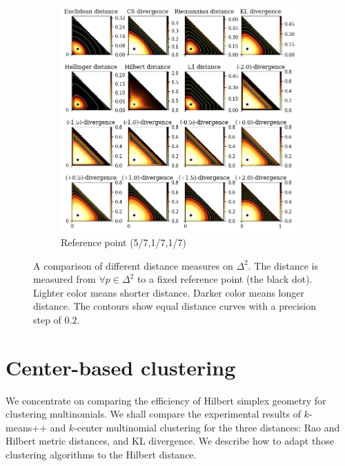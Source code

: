 \documentclass[graybox]{svmult}
\begin{document}
\begin{figure}\ContinuedFloat
\centering
\begin{subfigure}{\textwidth}
\includegraphics[width=\textwidth]{categories2}
\caption{Reference point (5/7,1/7,1/7)}
\end{subfigure}
\caption{A comparison of different distance measures on $\Delta^2$. The distance is measured from
$\forall{p}\in\Delta^2$ to a fixed reference point (the black dot). Lighter color means shorter
distance. Darker color means longer distance. The contours show equal distance curves with a precision step of $0.2$.\label{vis:distance}}
\end{figure}


\section{Center-based clustering}\label{sec:clustering}

We concentrate on comparing the efficiency of Hilbert simplex geometry for clustering multinomials.
We shall compare the experimental results of $k$-means++ and $k$-center multinomial clustering for
the three distances: Rao and Hilbert metric distances, and KL divergence.
We describe how to adapt those clustering algorithms to the Hilbert distance.
\end{document}
